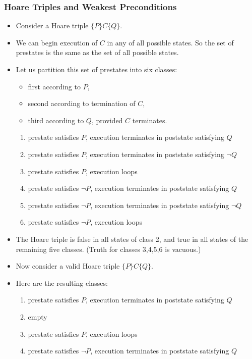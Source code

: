 \begin{multicols}{2}
\subsubsection{Hoare Triples and Weakest Preconditions}
\begin{itemize}
  \item Consider a Hoare triple $\{P\}C\{Q\}$.
  \item We can begin execution of $C$ in any of all possible states. So the set of prestates is the same as the set of all possible states.
  \item Let us partition this set of prestates into six classes:
  \begin{itemize}
    \item first according to $P$,
    \item second according to termination of $C$,
    \item third according to $Q$, provided $C$ terminates.
  \end{itemize}
  \begin{enumerate}
    \item prestate satisfies $P$, execution terminates in poststate satisfying $Q$
    \item prestate satisfies $P$, execution terminates in poststate satisfying $\neg Q$
    \item prestate satisfies $P$, execution loops
    \item prestate satisfies $\neg P$, execution terminates in poststate satisfying $Q$
    \item prestate satisfies $\neg P$, execution terminates in poststate satisfying $\neg Q$
    \item prestate satisfies $\neg P$, execution loops
  \end{enumerate}
  \item The Hoare triple is false in all states of class 2, and true in all states of the remaining five classes. (Truth for classes 3,4,5,6 is vacuous.)
  \item Now consider a valid Hoare triple $\{P\}C\{Q\}$.
  \item Here are the resulting classes:
  \begin{enumerate}
    \item prestate satisfies $P$, execution terminates in poststate satisfying $Q$
    \item empty
    \item prestate satisfies $P$, execution loops
    \item prestate satisfies $\neg P$, execution terminates in poststate satisfying $Q$

\end{enumerate}
\end{itemize}
\end{multicols}
